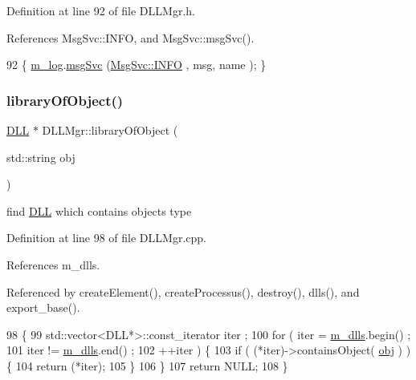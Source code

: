 Definition at line 92 of file D\+L\+L\+Mgr.\+h.



References Msg\+Svc\+::\+I\+N\+FO, and Msg\+Svc\+::msg\+Svc().


\begin{DoxyCode}
92 \{ \hyperlink{classDLLMgr_a64b523faed64378451ee76f6fbf0800d}{m\_log}.\hyperlink{classMsgSvc_ad25f18047920cc59a314e5098259711c}{msgSvc} (\hyperlink{classMsgSvc_ae671eb7301996cd049d2da8a65925926ad2fcf3f3e734fc41ee097cc23670ce51}{MsgSvc::INFO}    , msg, name ); \}
\end{DoxyCode}
\mbox{\label{classDLLMgr_a7e8c992899b7357158aef047a2f15c51}} 
\subsubsection{\texorpdfstring{library\+Of\+Object()}{libraryOfObject()}}
{\footnotesize\ttfamily \hyperlink{classDLL}{D\+LL} $\ast$ D\+L\+L\+Mgr\+::library\+Of\+Object (\begin{DoxyParamCaption}\item[{std\+::string}]{obj }\end{DoxyParamCaption})}

find \hyperlink{classDLL}{D\+LL} which contains objects type 

Definition at line 98 of file D\+L\+L\+Mgr.\+cpp.



References m\+\_\+dlls.



Referenced by create\+Element(), create\+Processus(), destroy(), dlls(), and export\+\_\+base().


\begin{DoxyCode}
98                                              \{
99   std::vector<DLL*>::const\_iterator iter ;
100   \textcolor{keywordflow}{for} ( iter = \hyperlink{classDLLMgr_a5bd713edea21d64f32aa71162bca581a}{m\_dlls}.begin() ; 
101         iter != \hyperlink{classDLLMgr_a5bd713edea21d64f32aa71162bca581a}{m\_dlls}.end()  ; 
102         ++iter ) \{
103     \textcolor{keywordflow}{if} ( (*iter)->containsObject( \hyperlink{namespaceshell_a7c2aab80550f476d91e0d8f0c350a635}{obj} ) )\{
104       \textcolor{keywordflow}{return} (*iter);
105     \}
106   \}
107   \textcolor{keywordflow}{return} NULL;
108 \}
\end{DoxyCode}
\mbox{\label{classDLLMgr_a3c92bec62ace09dd00959c31bb2475d6}} 
